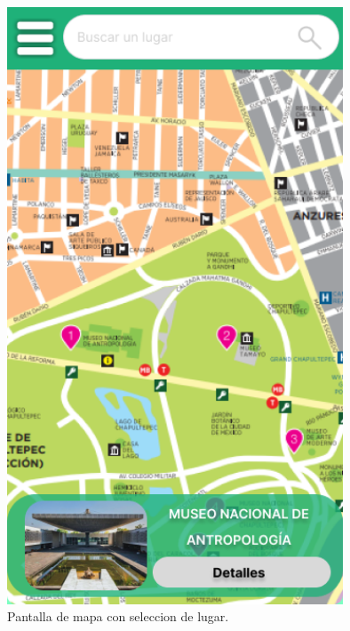 \begin{figure}[htb]
    \centering
    \includegraphics[width=10cm]{pantalla6.png}
    \caption{Pantalla de mapa con seleccion de lugar.}
    \label{fig:enter-label}
\end{figure}

